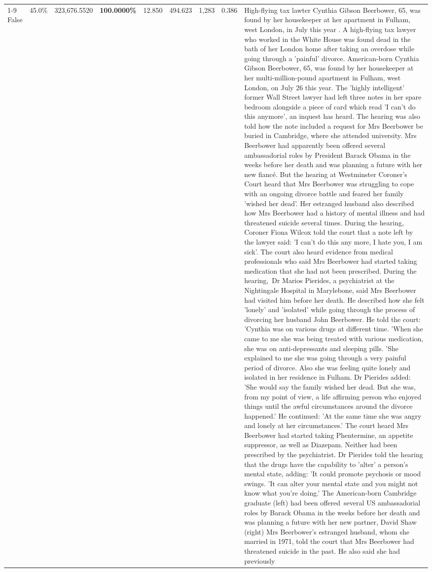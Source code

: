 \begin{table}[H]
\begin{tabular}{lllrlllll}
\cline{1-9}
False & 45.0\% & 323,676.5520 & \bfseries \color{red} 100.0000\% & 12.850 & 494.623 & 1,283 & 0.386 & High-flying tax lawter Cynthia Gibson Beerbower, 65, was found by her housekeeper at her apartment in Fulham, west London, in July this year . A high-flying tax lawyer who worked in the White House was found dead in the bath of her London home after taking an overdose while going through a 'painful' divorce. American-born Cynthia Gibson Beerbower, 65, was found by her housekeeper at her multi-million-pound apartment in Fulham, west London, on July 26 this year. The 'highly intelligent' former Wall Street lawyer had left three notes in her spare bedroom alongside a piece of card which read 'I can't do this anymore', an inquest has heard. The hearing was also told how the note included a request for Mrs Beerbower be buried in Cambridge, where she attended university. Mrs Beerbower had apparently been offered several ambassadorial roles by President Barack Obama in the weeks before her death and was planning a future with her new fiancé. But the hearing at Westminster Coroner's Court heard that Mrs Beerbower was struggling to cope with an ongoing divorce battle and feared her family 'wished her dead'. Her estranged husband also described how Mrs Beerbower had a history of mental illness and had threatened suicide several times. During the hearing, Coroner Fiona Wilcox told the court that a note left by the lawyer said: 'I can't do this any more, I hate you, I am sick'. The court also heard evidence from medical professionals who said Mrs Beerbower had started taking medication that she had not been prescribed. During the hearing, Dr Marios Pierides, a psychiatrist at the Nightingale Hospital in Marylebone, said Mrs Beerbower had visited him before her death. He described how she felt 'lonely' and 'isolated' while going through the process of divorcing her husband John Beerbower. He told the court: 'Cynthia was on various drugs at different time. 'When she came to me she was being treated with various medication, she was on anti-depressants and sleeping pills. 'She explained to me she was going through a very painful period of divorce. Also she was feeling quite lonely and isolated in her residence in Fulham. Dr Pierides added: 'She would say the family wished her dead. But she was, from my point of view, a life affirming person who enjoyed things until the awful circumstances around the divorce happened.' He continued: 'At the same time she was angry and lonely at her circumstances.' The court heard Mrs Beerbower had started taking Phentermine, an appetite suppressor, as well as Diazepam. Neither had been prescribed by the psychiatrist. Dr Pierides told the hearing that the drugs have the capability to 'alter' a person's mental state, adding: 'It could promote psychosis or mood swings. 'It can alter your mental state and you might not know what you're doing.' The American-born Cambridge graduate (left) had been offered several US ambassadorial roles by Barack Obama in the weeks before her death and was planning a future with her new partner, David Shaw (right) Mrs Beerbower's estranged husband, whom she married in 1971, told the court that Mrs Beerbower had threatened suicide in the past. He also said she had previously 
\end{tabular}
\end{table}
